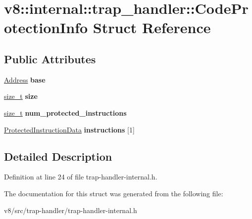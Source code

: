\hypertarget{structv8_1_1internal_1_1trap__handler_1_1CodeProtectionInfo}{}\section{v8\+:\+:internal\+:\+:trap\+\_\+handler\+:\+:Code\+Protection\+Info Struct Reference}
\label{structv8_1_1internal_1_1trap__handler_1_1CodeProtectionInfo}
\subsection*{Public Attributes}
\begin{DoxyCompactItemize}
\item 
\mbox{\label{structv8_1_1internal_1_1trap__handler_1_1CodeProtectionInfo_ab3785b18fd0e85cda62f7f1200b0955d}} 
\mbox{\hyperlink{classuintptr__t}{Address}} {\bfseries base}
\item 
\mbox{\label{structv8_1_1internal_1_1trap__handler_1_1CodeProtectionInfo_ab9f03183539701451fc0eb7850145697}} 
\mbox{\hyperlink{classsize__t}{size\+\_\+t}} {\bfseries size}
\item 
\mbox{\label{structv8_1_1internal_1_1trap__handler_1_1CodeProtectionInfo_ae028786fdc3856febc682cff04105167}} 
\mbox{\hyperlink{classsize__t}{size\+\_\+t}} {\bfseries num\+\_\+protected\+\_\+instructions}
\item 
\mbox{\label{structv8_1_1internal_1_1trap__handler_1_1CodeProtectionInfo_a83f6b9b7e9e1188826c8be5dd8a3a23f}} 
\mbox{\hyperlink{structv8_1_1internal_1_1trap__handler_1_1ProtectedInstructionData}{Protected\+Instruction\+Data}} {\bfseries instructions} \mbox{[}1\mbox{]}
\end{DoxyCompactItemize}


\subsection{Detailed Description}


Definition at line 24 of file trap-\/handler-\/internal.\+h.



The documentation for this struct was generated from the following file\+:\begin{DoxyCompactItemize}
\item 
v8/src/trap-\/handler/trap-\/handler-\/internal.\+h\end{DoxyCompactItemize}
